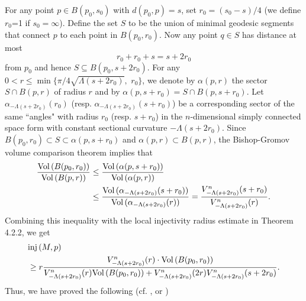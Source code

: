 For any point $p\in B(p_0, s_0)$ with $d(p_0, p)=s$, set
$r_0=(s_0-s)/4$ (we define $r_0$=1 if $s_0=\infty$). Define the
set $S$ to be the union of minimal geodesic segments that connect
$p$ to each point in $B(p_0, r_0)$. Now any point $q\in S$ has
distance at most
$$
r_0+r_0+s=s+2r_0
$$
from $p_0$ and hence $S\subseteq B(p_0, s+2r_0)$. For any $0<r\le
\min\{\pi/4\sqrt{\Lambda(s+2r_0)},$ $r_0\}$, we denote by $\alpha
(p, r)$ the sector $S\cap B(p,r)$ of radius $r$ and by $\alpha (p,
s+r_0)=S \cap B(p,s+r_0)$. Let $\alpha_{-\Lambda(s+2r_0)}(r_0)$
(resp. $\alpha_{-\Lambda(s+2r_0)} (s+r_0)$) be a corresponding
sector of the same ``angles" with radius $r_0$ (resp. $s+r_0$) in
the $n$-dimensional simply connected space form with constant
sectional curvature $-\Lambda(s+2r_0)$. Since $B(p_0, r_0)\subset
S\subset\alpha (p,s+r_0)$ and $\alpha (p, r)\subset B(p,r)$, the
Bishop-Gromov volume comparison theorem implies that
\begin{align*}
\frac{{\rm Vol}\,(B(p_0,r_0))}{{\rm Vol}\,(B(p,r))}
&\le \frac{{\rm Vol}\,(\alpha (p,s+r_0))}{{\rm Vol}\,(\alpha (p,r))} \\
&\le\frac{{\rm Vol}\,(\alpha_{-\Lambda(s+2r_0)}(s+r_0))}{{\rm Vol}\,(\alpha_
{-\Lambda(s+2r_0)}(r))}=\frac{V^n_{-\Lambda(s+2r_0)}(s+r_0)}{V^n_
{-\Lambda(s+2r_0)}(r)}.
\end{align*}
Combining this inequality with the local injectivity radius
estimate in Theorem 4.2.2, we get
\begin{align*}
&{\rm inj}\,(M,p) \\
&\geq r \frac{V^{n}_{-\Lambda(s+2r_0)}(r)\cdot
{\rm Vol}\,(B(p_0,r_0))}{V^{n}_{-\Lambda(s+2r_0)}(r){\rm Vol}\,(B(p_0,r_0))+
V_{-\Lambda(s+2r_0)}^n(2r)V^{n}_{-\Lambda(s+2r_0)}(s+2r_0)}.
\end{align*}
Thus, we have proved the following (cf. \cite{CLY}, \cite{CGT} or
\cite{AM})

